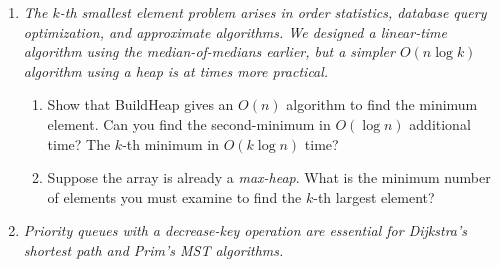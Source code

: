 \documentclass[9pt]{book}
\begin{document}
\begin{enumerate}[label=\arabic*.]


\item \textit{The $k$-th smallest element problem arises in order statistics, 
database query optimization, and approximate algorithms. We designed a linear-time algorithm 
using the median-of-medians earlier, 
but a simpler $O(n \log k)$ algorithm using a heap is at times more practical.}

\begin{enumerate}
    \item Show that BuildHeap gives an $O(n)$ algorithm to find the minimum element. 
    Can you find the second-minimum in $O(\log n)$ additional time? 
    The $k$-th minimum in $O(k \log n)$ time?
    \item Suppose the array is already a \emph{max-heap}. What is the minimum number of elements
    you must examine to find the $k$-th largest element?
\end{enumerate}

\item \textit{Priority queues with a decrease-key operation are essential for Dijkstra's shortest path and Prim's MST algorithms.}


\end{enumerate}
\end{document}
